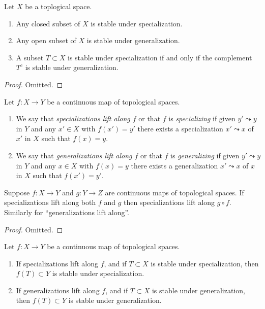 \begin{lemma}
\label{lemma-open-closed-specialization}
Let $X$ be a toplogical space.
\begin{enumerate}
\item Any closed subset of $X$ is stable under specialization.
\item Any open subset of $X$ is stable under generalization.
\item A subset $T \subset X$ is stable under specialization
if and only if
the complement $T^c$ is stable under generalization.
\end{enumerate}
\end{lemma}

\begin{proof}
Omitted.
\end{proof}

\begin{definition}
\label{definition-lift-specializations}
Let $f : X \to Y$ be a continuous map of topological spaces.
\begin{enumerate}
\item We say that {\it specializations lift along $f$} or that $f$ is
{\it specializing} if given $y' \leadsto y$ in $Y$ and any $x'\in X$ with
$f(x') = y'$ there exists a specialization $x' \leadsto x$ of $x'$ in $X$ such
that $f(x) = y$.
\item We say that {\it generalizations lift along $f$} or that $f$ is
{\it generalizing} if given $y' \leadsto y$ in $Y$ and any $x\in X$ with
$f(x) = y$ there exists a generalization $x' \leadsto x$ of $x$ in $X$ such
that $f(x') = y'$.
\end{enumerate}
\end{definition}

\begin{lemma}
\label{lemma-lift-specialization-composition}
Suppose $f : X \to Y$ and $g : Y \to Z$ are continuous maps
of topological spaces. If specializations lift along both $f$ and $g$
then specializations lift along $g \circ f$. Similarly for
``generalizations lift along''.
\end{lemma}

\begin{proof}
Omitted.
\end{proof}

\begin{lemma}
\label{lemma-lift-specializations-images}
Let $f : X \to Y$ be a continuous map of topological spaces.
\begin{enumerate}
\item If specializations lift along $f$, and if $T \subset X$
is stable under specialization, then $f(T) \subset Y$ is
stable under specialization.
\item If generalizations lift along $f$, and if $T \subset X$
is stable under generalization, then $f(T) \subset Y$ is
stable under generalization.
\end{enumerate}
\end{lemma}

